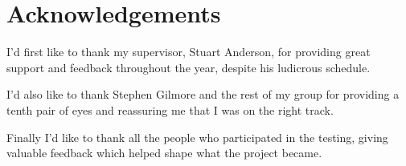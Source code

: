 \section*{Acknowledgements}

	I'd first like to thank my supervisor, Stuart Anderson, for providing great
	support and feedback throughout the year, despite his ludicrous schedule.
	
	I'd also like to thank Stephen Gilmore and the rest of my group for providing
	a tenth pair of eyes and reassuring me that I was on the right track.
	
	Finally I'd like to thank all the people who participated in the testing,
	giving valuable feedback which helped shape what the project became.
